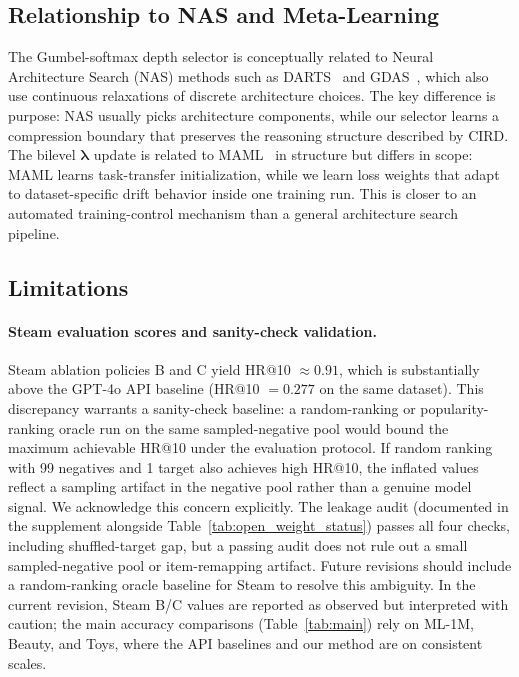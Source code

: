 \documentclass[lettersize,journal]{IEEEtran}
\newcommand{\lambdavec}{\boldsymbol{\lambda}}
\begin{document}
\subsection{Relationship to NAS and Meta-Learning}

The Gumbel-softmax depth selector is conceptually related to
Neural Architecture Search (NAS) methods such as
DARTS~\cite{liu2019darts} and GDAS~\cite{dong2019searching},
which also use continuous relaxations of discrete architecture
choices.
The key difference is purpose: NAS usually picks architecture
components, while our selector learns a compression boundary that
preserves the reasoning structure described by CIRD.
The bilevel $\lambdavec$ update is related to
MAML~\cite{finn2017maml} in structure but differs in scope:
MAML learns task-transfer initialization, while we learn loss
weights that adapt to dataset-specific drift behavior inside
one training run.
This is closer to an automated training-control mechanism than a
general architecture search pipeline.

\subsection{Limitations}

\paragraph*{Steam evaluation scores and sanity-check validation.}
Steam ablation policies B and C yield HR@10 $\approx 0.91$,
which is substantially above the GPT-4o API baseline (HR@10 $= 0.277$
on the same dataset).
This discrepancy warrants a sanity-check baseline: a random-ranking
or popularity-ranking oracle run on the same sampled-negative pool
would bound the maximum achievable HR@10 under the evaluation protocol.
If random ranking with 99 negatives and 1 target also achieves high
HR@10, the inflated values reflect a sampling artifact in the negative
pool rather than a genuine model signal.
We acknowledge this concern explicitly.
The leakage audit (documented in the supplement alongside
Table~\ref{tab:open_weight_status}) passes all four checks,
including shuffled-target gap, but a passing audit does not rule
out a small sampled-negative pool or item-remapping artifact.
Future revisions should include a random-ranking oracle baseline
for Steam to resolve this ambiguity.
In the current revision, Steam B/C values are reported as observed
but interpreted with caution; the main accuracy comparisons
(Table~\ref{tab:main}) rely on ML-1M, Beauty, and Toys, where
the API baselines and our method are on consistent scales.
\end{document}
